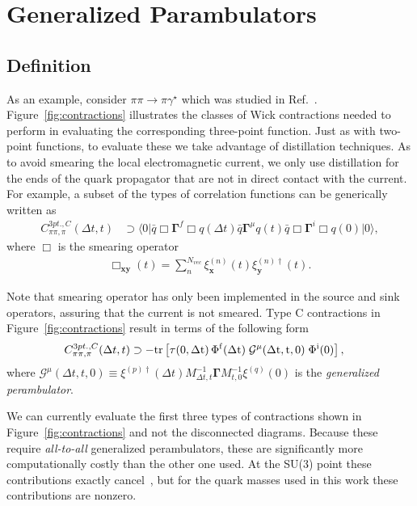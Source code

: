 \documentclass[prd,showpacs,showkeys,preprintnumbers,floatfix,
nofootinbib,superscriptaddress]{revtex4}
\begin{document}
\section{Generalized Parambulators}
\subsection{Definition}
As an example, consider  $\pi\pi\to\pi\gamma^\star$ which was studied in Ref.~\cite{Briceno:2015dca}. Figure~\ref{fig:contractions} illustrates the classes of Wick contractions needed to perform in evaluating the corresponding three-point function. Just as with two-point functions, to evaluate these we take advantage of distillation techniques. As to avoid smearing the local electromagnetic current, we only use distillation for the ends of the quark propagator that are not in direct contact with the current. For example, a subset of the types of correlation functions can be generically written as
\begin{align}
C^{3pt.,C}_{\pi\pi,\pi}(\Delta t,t)&\supset \big\langle 0 \big| \bar{q} \Box \mathbf{\Gamma}^f \Box q (\Delta t)   
					\bar{q} \mathbf{\Gamma}^\mu q (t) 
					\bar{q} \Box \mathbf{\Gamma}^i \Box q (0) \big| 0 \big\rangle \nonumber,
\end{align}
where $\Box$ is the smearing operator
\begin{align}
\Box_{\textbf{x}\textbf{y}}(t)= \sum_n^{N_{vec}}\xi^{(n)}_{\textbf{x}}(t) \xi^{(n)\dag}_{\textbf{y}}(t).
\end{align}

Note that smearing operator has only been implemented in the source and sink operators, assuring that the current is not smeared. Type C contractions in Figure~\ref{fig:contractions} result in terms of the following form
\begin{align}
C^{3pt.,C}_{\pi\pi,\pi}(\Delta t,t)&\supset 
 - \rm{tr}\left[ \tau(0,\Delta t)\, \Phi^f(\Delta t)
\; \mathcal{G}^\mathbf{\mu}(\Delta t, t, 0) \;
 \Phi^i(0) \right], \nonumber
\end{align}
where $\mathcal{G}^{\mu}(\Delta t, t, 0)\equiv \xi^{(p)\dag}(\Delta t) M^{-1}_{\Delta t, t} \mathbf{\Gamma} M^{-1}_{t,0} \xi^{(q)}(0)$ is the \emph{generalized perambulator}.

We can currently evaluate the first three types of contractions shown in Figure~\ref{fig:contractions} and not the disconnected diagrams. Because these require \emph{all-to-all} generalized perambulators, these are significantly more computationally costly than the other one used. At the SU(3) point these contributions exactly cancel~\cite{Shultz:2015pfa}, but for the quark masses used in this work these contributions are nonzero.  
\end{document}
